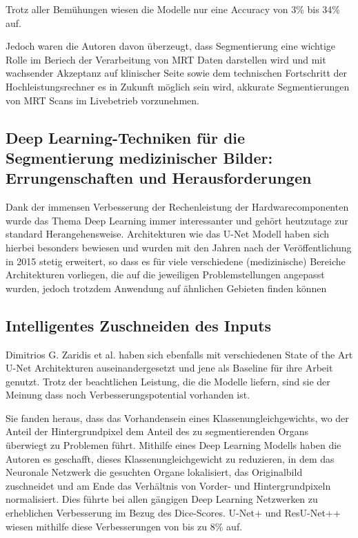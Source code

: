 Trotz aller Bemühungen wiesen die Modelle nur eine Accuracy von 3\% bis 34\% auf. \citet{Clarke:Mri1995}

Jedoch waren die Autoren davon überzeugt, dass Segmentierung eine wichtige Rolle im Beriech der Verarbeitung von MRT Daten darstellen wird und mit wachsender Akzeptanz auf klinischer Seite sowie dem technischen Fortschritt der Hochleistungsrechner es in Zukunft möglich sein wird, akkurate Segmentierungen von MRT Scans im Livebetrieb vorzunehmen.

\newpage

\subsection{Deep Learning-Techniken für die Segmentierung medizinischer Bilder:
Errungenschaften und Herausforderungen}

Dank der immensen Verbesserung der Rechenleistung der Hardwarecomponenten wurde das Thema Deep Learning immer interessanter und gehört heutzutage zur standard Herangehensweise. Architekturen wie das U-Net Modell \citet{U-Net} haben sich hierbei besonders bewiesen und wurden mit den Jahren nach der Veröffentlichung in 2015 stetig erweitert, so dass es für viele verschiedene (medizinische) Bereiche Architekturen vorliegen, die auf die jeweiligen Problemstellungen angepasst wurden, jedoch trotzdem Anwendung auf ähnlichen Gebieten finden können \citet{Hesamian}

\subsection{Intelligentes Zuschneiden des Inputs}

Dimitrios G. Zaridis et al. \citet{SmartCrop} haben sich ebenfalls mit verschiedenen State of the Art U-Net Architekturen auseinandergesetzt und jene als Baseline für ihre Arbeit genutzt. Trotz der beachtlichen Leistung, die die Modelle liefern, sind sie der Meinung dass noch Verbesserungspotential vorhanden ist.

Sie fanden heraus, dass das Vorhandensein eines Klassenungleichgewichts, wo der Anteil der Hintergrundpixel dem Anteil des zu segmentierenden Organs überwiegt zu Problemen führt. Mithilfe eines Deep Learning Modells haben die Autoren es geschafft, dieses Klassenungleichgewicht zu reduzieren, in dem das Neuronale Netzwerk die gesuchten Organe lokalisiert, das Originalbild zuschneidet und am Ende das Verhältnis von Vorder- und Hintergrundpixeln normalisiert. Dies führte bei allen gängigen Deep Learning Netzwerken zu erheblichen Verbesserung im Bezug des Dice-Scores. U-Net+ und ResU-Net++ wiesen mithilfe diese Verbesserungen von bis zu 8\% auf.

